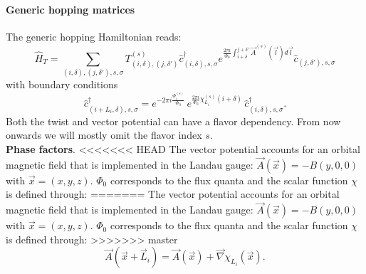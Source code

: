 \paragraph*{Generic hopping matrices}\label{sec:generic_hopping}

The generic hopping Hamiltonian  reads: 
\begin{equation}
\hat{H}_T = \sum_{(i,\delta), (j,\delta'), s, \sigma}    T_{(i,\delta), (j,\delta')}^{(s)}    \hat{c}^{\dagger}_{(i,\delta),s,\sigma }   e^{\frac{2 \pi i}{\Phi_0} \int_{i + \delta}^{j + \delta'}  \vec{A}^{(s)}(\vec{l})  d \vec{l}} \hat{c}^{}_{(j,\delta'),s,\sigma }
\label{generic_hopping.eq}
\end{equation}
with boundary conditions 
\begin{equation}
\hat{c}^{\dagger}_{(i + L_i,\delta) ,s,\sigma }   =  e^{- 2 \pi i\frac{\Phi_i^{(s)}}{\Phi_0}} \, e^{\frac{2 \pi i }{\Phi_0} \chi^{(s)}_{L_i} ( i + \delta ) } \, \hat{c}^{\dagger}_{(i,\delta) ,s,\sigma }.
\label{generic_boundary.eq}
\end{equation}
Both the twist and  vector  potential can have a flavor dependency.
From now onwards we will  mostly omit the flavor index ${s}$.\\

\noindent
\textbf{Phase factors}.  
<<<<<<< HEAD
The vector potential accounts for an orbital magnetic field that is implemented  in the Landau  gauge:  $\vec{A}(\vec{x})  =  -B(y,0,0) $ with $ \vec{x} = (x,y,z)$. $\Phi_0$ corresponds to the flux  quanta and the scalar function $\chi$ is defined  through:
=======
The vector potential accounts for an orbital magnetic field that is implemented  in the Landau  gauge:  $\vec{A}(\vec{x})  =  -B(y,0,0) $ with $ \vec{x} = (x,y,z)$. $\Phi_0$ corresponds to the flux quanta and the scalar function $\chi$ is defined through:
>>>>>>> master
\begin{equation}
\vec{A}( \vec{x} + \vec{L}_{i} )  = \vec{A}( \vec{x} )   +  \vec{\nabla} \chi_{L_{i}}(\vec{x}). 
\end{equation}


